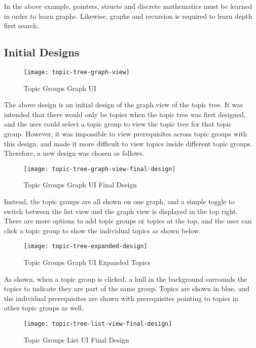 In the above example, pointers, structs and discrete mathematics must be learned in order to learn graphs. Likewise, graphs and recursion is required to learn depth first search.\\

\subsection{Initial Designs}
\begin{figure}[h!]
    \centering
    \texttt{[image: topic-tree-graph-view]}
    \caption{Topic Groups Graph UI}
\end{figure}

The above design is an initial design of the graph view of the topic tree. It was intended that there would only be topics when the topic tree was first designed, and the user could select a topic group to view the topic tree for that topic group. However, it was impossible to view prerequisites across topic groups with this design, and made it more difficult to view topics inside different topic groups. Therefore, a new design was chosen as follows.

\begin{figure}[h!]
    \centering
    \texttt{[image: topic-tree-graph-view-final-design]}
    \caption{Topic Groups Graph UI Final Design}
\end{figure}

Instead, the topic groups are all shown on one graph, and a simple toggle to switch between the list view and the graph view is displayed in the top right. There are more options to add topic groups or topics at the top, and the user can click a topic group to show the individual topics as shown below.

\begin{figure}[h!]
    \centering
    \texttt{[image: topic-tree-expanded-design]}
    \caption{Topic Groups Graph UI Expanded Topics}
\end{figure}

As shown, when a topic group is clicked, a hull in the background surrounds the topics to indicate they are part of the same group. Topics are shown in blue, and the individual prerequisites are shown with prerequisites pointing to topics in other topic groups as well. 

\begin{figure}[h!]
    \centering
    \texttt{[image: topic-tree-list-view-final-design]}
    \caption{Topic Groups List UI Final Design}
\end{figure}

